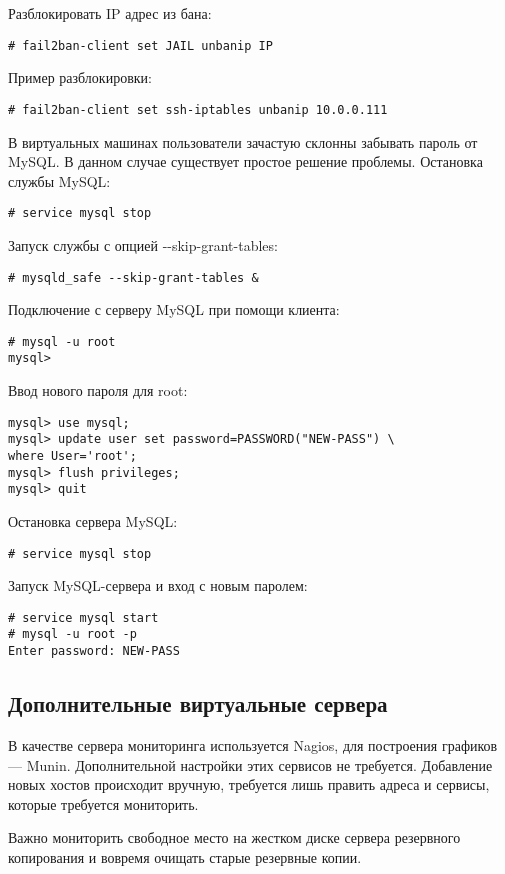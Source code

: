 Разблокировать IP адрес из бана:
\begin{lstlisting}
# fail2ban-client set JAIL unbanip IP
\end{lstlisting}

Пример разблокировки:
\begin{lstlisting}
# fail2ban-client set ssh-iptables unbanip 10.0.0.111
\end{lstlisting}

В виртуальных машинах пользователи зачастую склонны забывать пароль от MySQL.
В данном случае существует простое решение проблемы.
Остановка службы MySQL:
\begin{lstlisting}
# service mysql stop
\end{lstlisting}

Запуск службы с опцией -{}-skip-grant-tables:
\begin{lstlisting}
# mysqld_safe --skip-grant-tables &
\end{lstlisting}

Подключение с серверу MySQL при помощи клиента:
\begin{lstlisting}
# mysql -u root
mysql>
\end{lstlisting}

Ввод нового пароля для root:
\begin{lstlisting}
mysql> use mysql;
mysql> update user set password=PASSWORD("NEW-PASS") \
where User='root';
mysql> flush privileges;
mysql> quit
\end{lstlisting}

Остановка сервера MySQL:
\begin{lstlisting}
# service mysql stop
\end{lstlisting}

Запуск MySQL-сервера и вход с новым паролем:
\begin{lstlisting}
# service mysql start
# mysql -u root -p
Enter password: NEW-PASS
\end{lstlisting}

\subsection{Дополнительные виртуальные сервера}

В качестве сервера мониторинга используется Nagios, для построения графиков --- Munin.
Дополнительной настройки этих сервисов не требуется.
Добавление новых хостов происходит вручную, требуется лишь править адреса и сервисы, которые требуется мониторить.

Важно мониторить свободное место на жестком диске сервера резервного копирования и вовремя очищать старые резервные копии.

